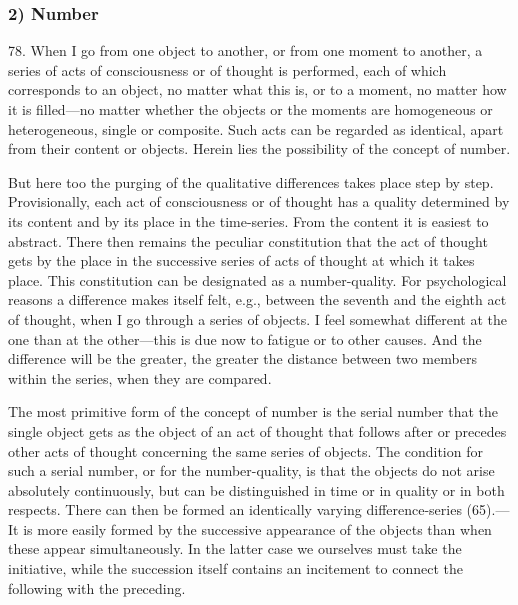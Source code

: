 \documentclass[12pt,a4paper]{book}
\newcommand{\opage}[1]{\marginnote{\footnotesize\textit{[#1]}}}
\begin{document}
\subsubsection*{2) Number}

78. When I go from one object to another, or from one moment to another, a
series of acts of consciousness or of thought is performed, each of which
corresponds to an object, no matter what this is, or to a moment, no matter
how it is filled---no matter whether the objects or the moments are
homogeneous or heterogeneous, single or \opage{190}composite. Such acts can be regarded
as identical, apart from their content or objects. Herein lies the
possibility of the concept of number.

But here too the purging of the qualitative differences takes place step by
step. Provisionally, each act of consciousness or of thought has a quality
determined by its content and by its place in the time-series. From the
content it is easiest to abstract. There then remains the peculiar
constitution that the act of thought gets by the place in the successive
series of acts of thought at which it takes place. This constitution can be
designated as a number-quality. For psychological reasons a difference makes
itself felt, e.g., between the seventh and the eighth act of thought, when I
go through a series of objects. I feel somewhat different at the one than at
the other---this is due now to fatigue or to other causes. And the difference
will be the greater, the greater the distance between two members within the
series, when they are compared.

The most primitive form of the concept of number is the serial number that
the single object gets as the object of an act of thought that follows after
or precedes other acts of thought concerning the same series of objects. The
condition for such a serial number, or for the number-quality, is that the
objects do not arise absolutely continuously, but can be distinguished in
time or in quality or in both respects. There can then be formed an
identically varying difference-series (65).---It is more easily formed by the
successive appearance of the objects than when these appear simultaneously.
In the latter case we ourselves must take the initiative, while the
succession itself contains an incitement to connect the following with the
preceding.
\end{document}

